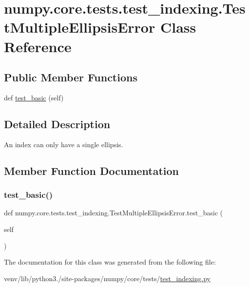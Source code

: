 \hypertarget{classnumpy_1_1core_1_1tests_1_1test__indexing_1_1TestMultipleEllipsisError}{}\section{numpy.\+core.\+tests.\+test\+\_\+indexing.\+Test\+Multiple\+Ellipsis\+Error Class Reference}
\label{classnumpy_1_1core_1_1tests_1_1test__indexing_1_1TestMultipleEllipsisError}
\subsection*{Public Member Functions}
\begin{DoxyCompactItemize}
\item 
def \hyperlink{classnumpy_1_1core_1_1tests_1_1test__indexing_1_1TestMultipleEllipsisError_a080dbcf3f34bdabdc3f00d8298762341}{test\+\_\+basic} (self)
\end{DoxyCompactItemize}


\subsection{Detailed Description}
\begin{DoxyVerb}An index can only have a single ellipsis.\end{DoxyVerb}
 

\subsection{Member Function Documentation}
\mbox{\label{classnumpy_1_1core_1_1tests_1_1test__indexing_1_1TestMultipleEllipsisError_a080dbcf3f34bdabdc3f00d8298762341}} 
\subsubsection{\texorpdfstring{test\+\_\+basic()}{test\_basic()}}
{\footnotesize\ttfamily def numpy.\+core.\+tests.\+test\+\_\+indexing.\+Test\+Multiple\+Ellipsis\+Error.\+test\+\_\+basic (\begin{DoxyParamCaption}\item[{}]{self }\end{DoxyParamCaption})}



The documentation for this class was generated from the following file\+:\begin{DoxyCompactItemize}
\item 
venv/lib/python3./site-\/packages/numpy/core/tests/\hyperlink{test__indexing_8py}{test\+\_\+indexing.\+py}\end{DoxyCompactItemize}
